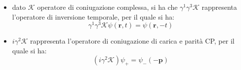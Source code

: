 \documentclass{subnucbo}
\begin{document}
\begin{itemize}
\begin{equation}
        \end{equation}
        \item dato $\mathcal{K}$ operatore di coniugazione complessa, si ha che $\gamma ^ { 1 } \gamma ^ { 3 } \mathcal { K }$ rappresenta l'operatore di inversione temporale, per il quale si ha:
        \begin{equation}
                \gamma ^ { 1 } \gamma ^ { 3 } \mathcal { K } \psi ( \mathbf { r } , t ) = \psi ( \mathbf { r } , - t )
        \end{equation}
        \item $i \gamma ^ { 2 } \mathcal { K }$ rappresenta l'operatore di coniugazione di carica e parità CP, per il quale si ha:
        \begin{equation}
                \left( i \gamma ^ { 2 } \mathcal { K } \right) \psi _ { + } = \psi _ { - } ( - \mathbf { p } )
        \end{equation}
\end{itemize}
\end{document}
